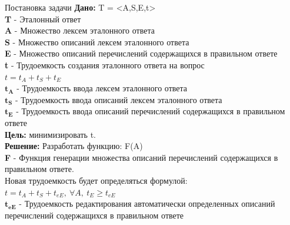 \documentclass[10pt,ps,serif,mathserif]{beamer}
\begin{document}
    \begin{frame}{Постановка задачи}
        \small
        \textbf{Дано:} T = <A,S,E,t> \\
        
        \hspace{0.5cm}\textbf{T} - Эталонный ответ \\
        \hspace{0.5cm}\textbf{A} - Множество лексем эталонного ответа\\
        \hspace{0.5cm}\textbf{S} - Множество описаний лексем эталонного ответа \\
        \hspace{0.5cm}\textbf{E} - Множество описаний перечислений содержащихся в правильном ответе \\
        \hspace{0.5cm}\textbf{t} - Трудоемкость создания эталонного ответа на вопрос \\
        \(t = t_{A} + t_{S} + t_{E}\) \\
        \hspace{0.5cm}\(\mathbf{t_A}\) - Трудоемкость ввода лексем эталонного ответа\\
        \hspace{0.5cm}\(\mathbf{t_S}\) - Трудоемкость ввода описаний лексем эталонного ответа \\
        \hspace{0.5cm}\(\mathbf{t_E}\) - Трудоемкость ввода описаний перечислений содержащихся в правильном ответе \\
        \textbf{Цель:} минимизировать t. \\
        \textbf{Решение:} 
        Разработать функцию: F(A) \\
        \hspace{0.5cm}\textbf{F} - Функция генерации множества описаний перечислений содержащихся в правильном ответе.\\
        Новая трудоемкость будет определяться формулой:\\
        \(t = t_{A} + t_{S} + t_{eE},  ~ \forall{A}, ~t_{E} \ge t_{eE} \) \\
        \hspace{0.5cm}\(\mathbf{t_{eE}}\) - Трудоемкость редактирования автоматически определенных описаний перечислений содержащихся в правильном ответе \\
        
    \end{frame}
\end{document}
